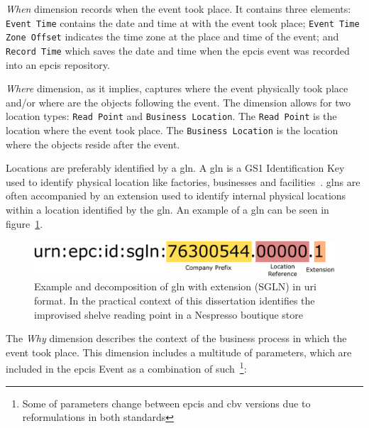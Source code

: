\emph{When} dimension records when the event took place. It contains three elements: \texttt{Event Time} contains the date and time at with the event took place; \texttt{Event Time Zone Offset} indicates the time zone at the place and time of the event; and \texttt{Record Time} which saves the date and time when the \ac{epcis} event was recorded into an \ac{epcis} repository.

\emph{Where} dimension, as it implies, captures where the event physically took place and/or where are the objects following the event. The dimension allows for two location types: \texttt{Read Point} and \texttt{Business Location}.
The \texttt{Read Point} is the location where the event took place. The \texttt{Business Location} is the location where the objects reside after the event.

Locations are preferably identified by a \ac{gln}. A \ac{gln} is a GS1 Identification Key used to identify physical location like factories, businesses and facilities~\cite{GS1KeysImplementation}. \acp{gln} are often accompanied by an extension used to identify internal physical locations within a location identified by the \ac{gln}. An example of a \ac{gln} can be seen in figure~\ref{fig:gln}. 

\begin{figure}[]
    \centering
    \includegraphics[width=\textwidth]{./figs/02-state-of-the-art/sglnexample.pdf}
    \caption{Example and decomposition of \ac{gln} with extension (SGLN) in \ac{uri} format. In the practical context of this dissertation identifies the improvised shelve reading point in a Nespresso boutique store} 
    \label{fig:gln}
\end{figure}

The \emph{Why} dimension describes the context of the business process in which the event took place.
This dimension includes a multitude of parameters, which are included in the \ac{epcis} Event as a combination of such~\footnote{Some of parameters change between \ac{epcis} and \ac{cbv} versions due to reformulations in both standards}:

